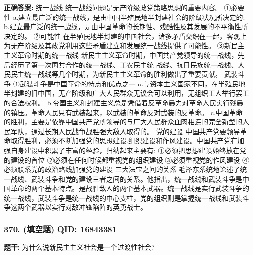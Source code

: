 \documentclass[12pt,UTF8]{ctexart}
\begin{document}
\textbf{正确答案:}
统一战线
统一战线问题是无产阶级政党策略思想的重要内容。
①必要性
a.建立最广泛的统一战线，是由中国半殖民地半封建社会的阶级状况所决定的:
b.建立最广泛的统一战线，是由中国革命的长期性、残酷性及其发展的不平衡性所决定的。
②可能性
在半殖民地半封建的中国社会，诸多矛盾交织在一起，客观上为无产阶级及其政党利用这些矛盾建立和发展统一战线提供了可能性。
③新民主主义革命时期的统一战线
新民主主义革命时期，中国共产党领导的统一战线，先后经历了第一次国共合作的统一战线、工农民主统-战线、抗日民族统一战线、人民民主统一战线等几个时期，为新民主主义革命的胜利做出了重要贡献。
武装斗争
①武装斗争是中国革命的特点和优点之一
a.与资本主义国家不同，在半殖民地半封建的旧中国，无产阶级和广大人民群众无议会可以利用，无组织工人举行罢工的合法权利。
b.帝国主义和封建主义总是凭借着反革命暴力对革命人民实行残暴的镇压。革命人民只有武装起来，以武装的革命反对武装的反革命。
c.中国革命的胜利，主要是依靠中国共产党所领导的与广大人民群众血肉相连的完全新型的人民军队，通过长期人民战争战胜强大敌人取得的。
党的建设
中国共产党要领导革命取得胜利，必须不断加强党的思想建设.组织建设和作风建设。中国共产党在加强自身建设中积累了丰富的经验，归纳起来主要有:
①必须把思想建设始终放在党的建设的首位
②必须在任何时候都重视党的组织建设
③必须重视党的作风建设
④必须联系党的政治路线加强党的建设
三大法宝之间的关系
毛泽东系统地论述了统一战线、武装斗争和党的建设三者之间的关系。他指出，统一战线和武装斗争是中国革命的两个基本特点。是战胜敌人的两个基本武器。统一战线是实行武装斗争的统一战线，武装斗争是统一战线的中心支柱，党的组织则是掌握统一战线和武装斗争这两个武器以实行对敌冲锋陷阵的英勇战士。

\vspace{0.3em}\hrulefill\vspace{0.7em}

\subsubsection*{370. (填空题) \small QID: 16843381}

\textbf{题干:}
为什么说新民主主义社会是一个过渡性社会?
\end{document}
